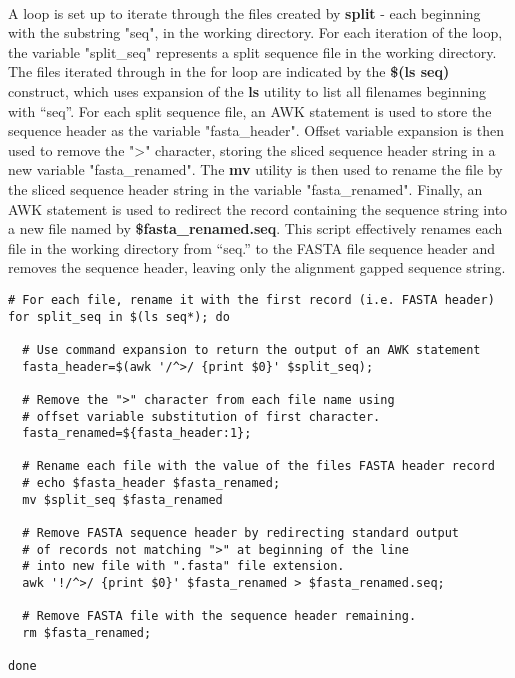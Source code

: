 \paragraph{} A loop is set up to iterate through the files created by \textbf{split} - each beginning with the substring "seq", in the working directory.  For each iteration of the loop, the variable "split\_seq" represents a split sequence file in the working directory.  The files iterated through in the for loop are indicated by the \textbf{\$(ls seq)} construct, which uses expansion of the \textbf{ls} utility to list all filenames beginning with “seq”.  For each split sequence file, an AWK statement is used to store the sequence header as the variable "fasta\_header".  Offset variable expansion is then used to remove the ">" character, storing the sliced sequence header string in a new variable "fasta\_renamed".  The  \textbf{mv} utility is then used to rename the file by the sliced sequence header string in the variable "fasta\_renamed".  Finally, an AWK statement is used to redirect the record containing the sequence string into a new file named by \textbf{\$fasta\_renamed.seq}.  This script effectively renames each file in the working directory from “seq.\*” to the FASTA file sequence header and removes the sequence header, leaving only the alignment gapped sequence string.

\vspace*{30pt} 

\begin{lstlisting}[caption=\textit{multi-fasta\_split.sh} removal of sequence header]
# For each file, rename it with the first record (i.e. FASTA header)
for split_seq in $(ls seq*); do
  
  # Use command expansion to return the output of an AWK statement
  fasta_header=$(awk '/^>/ {print $0}' $split_seq);
  
  # Remove the ">" character from each file name using
  # offset variable substitution of first character.
  fasta_renamed=${fasta_header:1};  
  
  # Rename each file with the value of the files FASTA header record
  # echo $fasta_header $fasta_renamed;
  mv $split_seq $fasta_renamed
  
  # Remove FASTA sequence header by redirecting standard output 
  # of records not matching ">" at beginning of the line
  # into new file with ".fasta" file extension.
  awk '!/^>/ {print $0}' $fasta_renamed > $fasta_renamed.seq;
  
  # Remove FASTA file with the sequence header remaining.
  rm $fasta_renamed;
  
done
\end{lstlisting}

